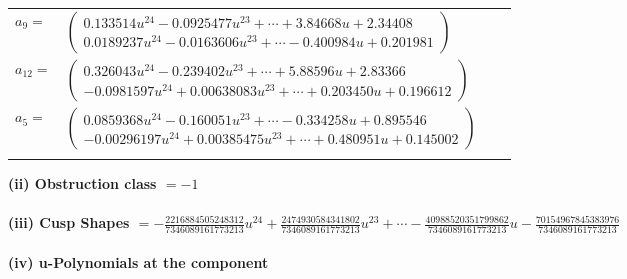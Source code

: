 \documentclass[1p]{elsarticle_modified}
\theoremstyle{definition}
\begin{document}
\begin{tabular}{m{7pt} m{180pt} m{7pt} m{180pt} }
\flushright $a_{9}=$&$\begin{pmatrix}0.133514 u^{24}-0.0925477 u^{23}+\cdots+3.84668 u+2.34408\\0.0189237 u^{24}-0.0163606 u^{23}+\cdots-0.400984 u+0.201981\end{pmatrix}$ \\
\flushright $a_{12}=$&$\begin{pmatrix}0.326043 u^{24}-0.239402 u^{23}+\cdots+5.88596 u+2.83366\\-0.0981597 u^{24}+0.00638083 u^{23}+\cdots+0.203450 u+0.196612\end{pmatrix}$ \\
\flushright $a_{5}=$&$\begin{pmatrix}0.0859368 u^{24}-0.160051 u^{23}+\cdots-0.334258 u+0.895546\\-0.00296197 u^{24}+0.00385475 u^{23}+\cdots+0.480951 u+0.145002\end{pmatrix}$\\&\end{tabular}
\flushleft \textbf{(ii) Obstruction class $= -1$}\\~\\
\flushleft \textbf{(iii) Cusp Shapes $= -\frac{2216884505248312}{7346089161773213} u^{24}+\frac{2474930584341802}{7346089161773213} u^{23}+\cdots-\frac{40988520351799862}{7346089161773213} u-\frac{70154967845383976}{7346089161773213}$}\\~\\
\newpage\renewcommand{\arraystretch}{1}
\flushleft \textbf{(iv) u-Polynomials at the component}\newline \\
\end{document}

